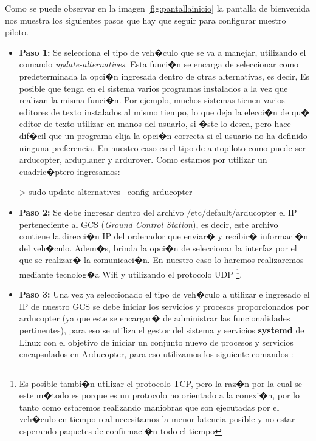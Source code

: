 		Como se puede observar en la imagen \ref{fig:pantallainicio} la pantalla de bienvenida nos muestra los siguientes pasos que hay que seguir para configurar nuestro piloto.
		\begin{itemize}
			\item \textbf{Paso 1:} Se selecciona el tipo de veh�culo que se va a manejar, utilizando el comando \textit{update-alternatives}. Esta funci�n se encarga de seleccionar como predeterminada la opci�n ingresada dentro de otras alternativas, es decir, 
			Es posible que tenga en el sistema varios programas instalados a la vez  que  realizan  la
			misma  funci�n. Por ejemplo, muchos sistemas tienen varios editores de texto instalados al
			mismo tiempo, lo que deja la elecci�n de  qu�  editor  de  texto  utilizar  en  manos  del
			usuario,  si  �ste lo desea, pero hace dif�cil que un programa elija la opci�n correcta si
			el usuario no ha definido ninguna preferencia. En nuestro caso es el tipo de autopiloto como puede ser arducopter, arduplaner y ardurover. Como estamos por utilizar un cuadric�ptero ingresamos:
			
			\begin{listing}[style=consola, numbers=none]
				> sudo update-alternatives --config arducopter
			\end{listing}
				
				
				
				\item \textbf{Paso 2:} Se debe ingresar dentro del archivo /etc/default/arducopter el IP perteneciente al GCS (\textit{Ground Control Station}), es decir, este archivo contiene la direcci�n IP del ordenador que enviar� y recibir� informaci�n del veh�culo. Adem�s, brinda la opci�n de seleccionar la interfaz por el que se realizar� la comunicaci�n. En nuestro caso lo haremos realizaremos mediante tecnolog�a Wifi y utilizando el protocolo UDP \footnote{Es posible tambi�n utilizar el protocolo TCP, pero la raz�n por la cual se este m�todo es porque es un protocolo no orientado a la conexi�n, por lo tanto como estaremos realizando maniobras que son ejecutadas por el veh�culo en tiempo real necesitamos la menor latencia posible y no estar esperando paquetes de confirmaci�n todo el tiempo}. 
				
				\item \textbf{Paso 3:} Una vez ya seleccionado el tipo de veh�culo a utilizar e ingresado el IP de nuestro GCS se debe iniciar los servicios y procesos proporcionados por arducopter (ya que este se encargar� de administrar las funcionalidades pertinentes), para eso se utiliza el gestor del sistema y servicios \textbf{systemd} de Linux con el objetivo de iniciar un conjunto nuevo de procesos y servicios encapsulados en Arducopter, para eso utilizamos los siguiente comandos :
				

\end{itemize}
